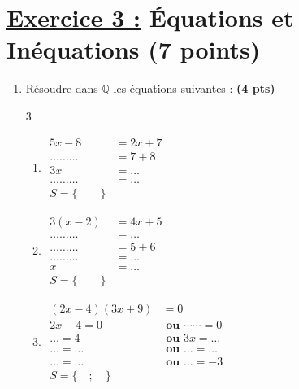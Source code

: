 \documentclass[12pt,a4paper]{article}
\begin{document}
\section*{\underline{Exercice 3 :} Équations et Inéquations (7 points)}
\begin{enumerate}
    \item Résoudre dans $\mathbb{Q}$ les équations suivantes : \textbf{(4 pts)}

\begin{multicols}{3}
\setlength{\columnseprule}{0.1mm}
\begin{enumerate}[leftmargin=*] %
\item[]
\begin{flushleft} %
\(
\begin{aligned}
5x - 8 &= 2x + 7\\[0.5cm]
\dots\dots\dots &= 7 + 8\\[0.5cm]
3x &= \dots \\[0.5cm]
\dots\dots\dots &= \dots \\[0.5cm]
\boxed{S=\{ \quad\quad \}}
\end{aligned}
\)
\end{flushleft}

\item[]
\begin{flushleft}
\(
\begin{aligned}
3(x - 2) &= 4x + 5\\[0.5cm]
\dots\dots\dots &= \dots \\[0.5cm]
\dots\dots\dots &= 5 + 6\\[0.5cm]
\dots\dots\dots &= \dots\\[0.5cm] 
x &= \dots\\[0.5cm]
\boxed{S=\{ \quad\quad \}}
\end{aligned}
\)
\end{flushleft}

\item[]
\begin{flushleft}
\(
\begin{aligned}
(2x - 4)(3x + 9) &= 0\\[0.5cm]
2x - 4 = 0 &\textbf{ ou } \cdots\cdots = 0\\[0.5cm]
\dots = 4 &\textbf{ ou } 3x = \dots \\[0.5cm]
\dots = \dots &\textbf{ ou } \dots = \dots\\[0.5cm]
\dots = \dots &\textbf{ ou } \dots = -3\\[0.5cm]
\boxed{S=\{ \quad ; \quad \}}
\end{aligned}
\)
\end{flushleft}
\end{enumerate}
\end{multicols}    
    

\end{enumerate}
\end{document}
